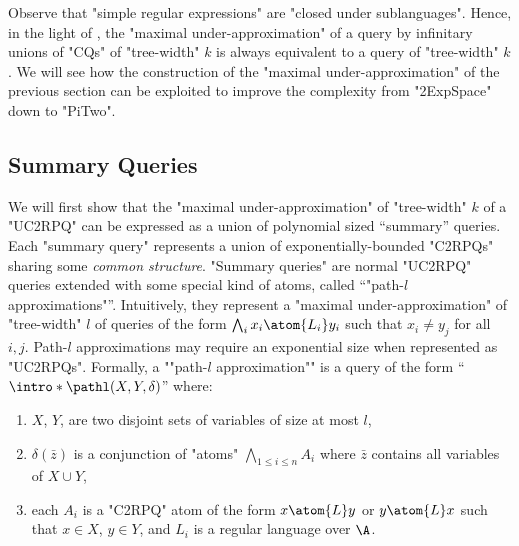 \thmSemTwSREpitwo 

Observe that "simple regular expressions" are "closed under sublanguages". Hence, in the light of
, the "maximal under-approximation" of a {\UCRPQSRE} query by infinitary unions of "CQs" of "tree-width" $k$ is always equivalent to a {\UCRPQSRE} query  of "tree-width" $k$. We will see how the construction of the "maximal under-approximation" of the previous section can be exploited to improve the complexity from "2ExpSpace" down to "PiTwo".

\subsection{\AP{}Summary Queries}
We will first show that the "maximal under-approximation" of "tree-width" $k$ of a "UC2RPQ" can be expressed as a union of polynomial sized ``summary'' queries. Each "summary query" represents a union of exponentially-bounded "C2RPQs" sharing some \emph{common structure}. 
"Summary queries" are normal "UC2RPQ" queries extended with some special kind of atoms, called ``"path-$l$ approximations"''. 
Intuitively, they represent a "maximal under-approximation" of "tree-width" $l$ of queries of the form $\bigwedge_i x_i \atom{L_i} y_i$ such that $x_i \neq y_j$ for all $i,j$. 
Path-$l$ approximations may require an exponential size when represented as "UC2RPQs".
%
\AP Formally, a ""path-$l$ approximation"" is a query of the form ``$\intro*\pathl(X, Y, \delta)$''
where: 
\begin{enumerate}
	\item $X$, $Y$, are two disjoint sets of variables of size at most $l$, 
	\item $\delta(\bar z)$ is a conjunction of "atoms" $\bigwedge_{1 \leq i \leq n} A_i$ where $\bar z$ contains all variables of $X \cup Y$,
	\item each $A_i$ is a "C2RPQ" atom of the form $x \atom{L} y$ or $y \atom{L} x$  such that $x \in X$, $y \in Y$, and $L_i$ is a regular language over $\A$.
\end{enumerate}
